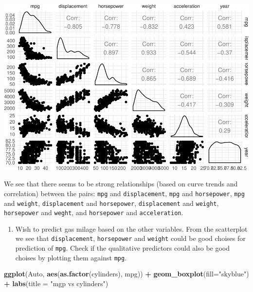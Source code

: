 \documentclass[]{article}
\newenvironment{Shaded}{\begin{snugshade}}{\end{snugshade}}
\newcommand{\KeywordTok}[1]{\textcolor[rgb]{0.13,0.29,0.53}{\textbf{#1}}}
\newcommand{\DataTypeTok}[1]{\textcolor[rgb]{0.13,0.29,0.53}{#1}}
\newcommand{\StringTok}[1]{\textcolor[rgb]{0.31,0.60,0.02}{#1}}
\newcommand{\OperatorTok}[1]{\textcolor[rgb]{0.81,0.36,0.00}{\textbf{#1}}}
\newcommand{\NormalTok}[1]{#1}
\providecommand{\tightlist}{%
  \setlength{\itemsep}{0pt}\setlength{\parskip}{0pt}}
\begin{document}
\includegraphics{RecEx2-sol_files/figure-latex/unnamed-chunk-7-1.pdf}

We see that there seems to be strong relationships (based on curve
trends and correlation) between the pairs: \texttt{mpg} and
\texttt{displacement}, \texttt{mpg} and \texttt{horsepower},
\texttt{mpg} and \texttt{weight}, \texttt{displacement} and
\texttt{horsepower}, \texttt{displacement} and \texttt{weight},
\texttt{horsepower} and \texttt{weght}, and \texttt{horsepower} and
\texttt{acceleration}.

\begin{enumerate}
\def\labelenumi{\alph{enumi})}
\setcounter{enumi}{5}
\tightlist
\item
  Wish to predict gas milage based on the other variables. From the
  scatterplot we see that \texttt{displacement}, \texttt{horsepower} and
  \texttt{weight} could be good choises for prediction of \texttt{mpg}.
  Check if the qualitative predictors could also be good choises by
  plotting them against \texttt{mpg}.
\end{enumerate}

\begin{Shaded}
\begin{Highlighting}[]
\KeywordTok{ggplot}\NormalTok{(Auto, }\KeywordTok{aes}\NormalTok{(}\KeywordTok{as.factor}\NormalTok{(cylinders), mpg)) }\OperatorTok{+}\StringTok{ }\KeywordTok{geom_boxplot}\NormalTok{(}\DataTypeTok{fill=}\StringTok{"skyblue"}\NormalTok{) }\OperatorTok{+}\StringTok{ }\KeywordTok{labs}\NormalTok{(}\DataTypeTok{title =} \StringTok{"mgp vs cylinders"}\NormalTok{) }
\end{Highlighting}
\end{Shaded}
\end{document}
